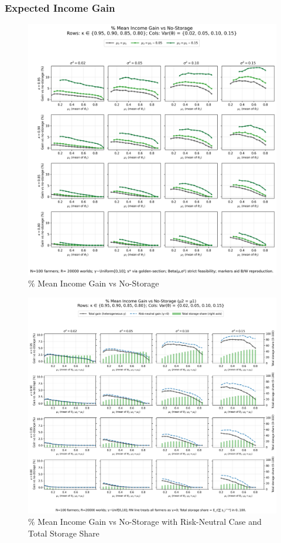 \subsubsection{Expected Income Gain}
\begin{figure}[ht!]
    \centering
    \includegraphics[width=\linewidth]{model_figures/gainpct_grid_4x4.png}
    \caption{$\%$ Mean Income Gain vs No-Storage}
    \label{fig: Income gains}
\end{figure}



\begin{figure}[ht!]
    \centering
    \includegraphics[width=\linewidth]{model_figures/gainpct_grid_4x4_zero_gap_total_storage_with_RN.png}
    \caption{$\%$ Mean Income Gain vs No-Storage with Risk-Neutral Case and Total Storage Share}
    \label{fig: Income gains with RN case}
\end{figure}


